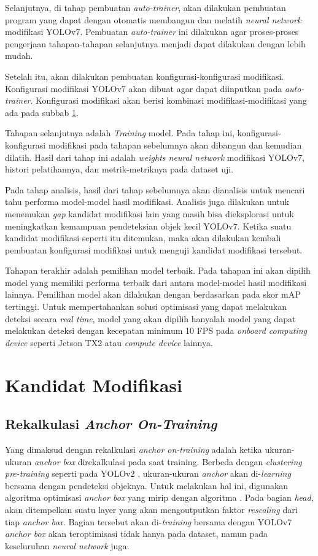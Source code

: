   Selanjutnya, di tahap pembuatan \emph{auto-trainer}, akan dilakukan pembuatan program yang dapat dengan otomatis membangun dan melatih \emph{neural network} modifikasi YOLOv7.
  Pembuatan \emph{auto-trainer} ini dilakukan agar proses-proses pengerjaan tahapan-tahapan selanjutnya menjadi dapat dilakukan dengan lebih mudah.

  Setelah itu, akan dilakukan pembuatan konfigurasi-konfigurasi modifikasi.
  Konfigurasi modifikasi YOLOv7 akan dibuat agar dapat diinputkan pada \emph{auto-trainer}.
  Konfigurasi modifikasi akan berisi kombinasi modifikasi-modifikasi yang ada pada subbab \ref{section:modificationcandidates}.

  Tahapan selanjutnya adalah \emph{Training} model.
  Pada tahap ini, konfigurasi-konfigurasi modifikasi pada tahapan sebelumnya akan dibangun dan kemudian dilatih.
  Hasil dari tahap ini adalah \emph{weights neural network} modifikasi YOLOv7, histori pelatihannya, dan metrik-metriknya pada dataset uji.

  Pada tahap analisis, hasil dari tahap sebelumnya akan dianalisis untuk mencari tahu performa model-model hasil modifikasi.
  Analisis juga dilakukan untuk menemukan \emph{gap} kandidat modifikasi lain yang masih bisa dieksplorasi untuk meningkatkan kemampuan pendeteksian objek kecil YOLOv7.
  Ketika suatu kandidat modifikasi seperti itu ditemukan, maka akan dilakukan kembali pembuatan konfigurasi modifikasi untuk menguji kandidat modifikasi tersebut.

  Tahapan terakhir adalah pemilihan model terbaik.
  Pada tahapan ini akan dipilih model yang memiliki performa terbaik dari antara model-model hasil modifikasi lainnya.
  Pemilihan model akan dilakukan dengan berdasarkan pada skor mAP tertinggi.
  Untuk mempertahankan solusi optimisasi yang dapat melakukan deteksi secara \emph{real time}, model yang akan dipilih hanyalah model yang dapat melakukan deteksi dengan kecepatan minimum 10 FPS pada \emph{onboard computing device} seperti Jetson TX2 atau \emph{compute device} lainnya.


\section{Kandidat Modifikasi}
\label{section:modificationcandidates}
  \subsection{Rekalkulasi \emph{Anchor On-Training}}
    Yang dimaksud dengan rekalkulasi \emph{anchor on-training}  adalah ketika ukuran-ukuran \emph{anchor box} direkalkulasi pada saat training.
    Berbeda dengan \emph{clustering pre-training} seperti pada YOLOv2 \parencite{yolov2}, ukuran-ukuran \emph{anchor} akan di-\emph{learning} bersama dengan pendeteksi objeknya.
    Untuk melakukan hal ini, digunakan algoritma optimisasi \emph{anchor box} yang mirip dengan algoritma \textcite{anchoropt}.
    Pada bagian \emph{head}, akan ditempelkan suatu layer yang akan mengoutputkan faktor \emph{rescaling} dari tiap \emph{anchor box}.
    Bagian tersebut akan di-\emph{training} bersama dengan YOLOv7 \emph{anchor box} akan teroptimisasi tidak hanya pada dataset, namun pada keseluruhan \emph{neural network} juga.
